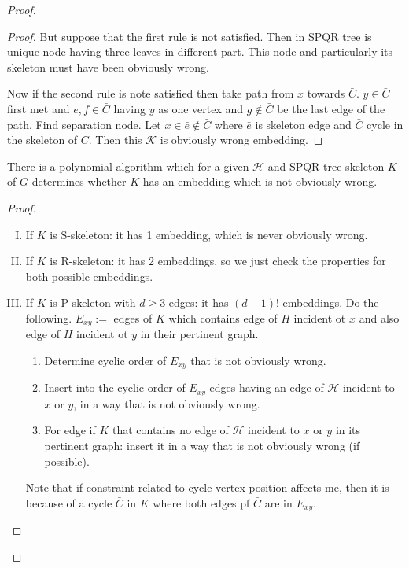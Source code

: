 \begin{proof}
\begin{proof}
		But suppose that the first rule is not satisfied. Then in SPQR tree is unique node having three leaves in different part. This node and particularly its skeleton must have been obviously wrong.
		
		Now if the second rule is note satisfied then take path from $x$ towards $\bar{C}$. $y \in \bar{C}$ first met and $e,f \in \bar{C}$ having $y$ as one vertex and $g \notin \bar{C}$ be the last edge of the path. Find separation node. Let $x\in \bar{e} \notin \bar{C}$ where $\bar{e}$ is skeleton edge and $\bar{C}$ cycle in the skeleton of $C$. Then this $\mathcal{K}$ is obviously wrong embedding.
	\end{proof}

	\begin{thm}
		There is a polynomial algorithm which for a given $\mathcal{H}$ and SPQR-tree skeleton $K$ of $G$ determines whether $K$ has an embedding which is not obviously wrong.
	\end{thm}

	\begin{proof}
		\begin{enumerate}[I)]
			\item If $K$ is S-skeleton: it has 1 embedding, which is never obviously wrong.
			\item If $K$ is R-skeleton: it has 2 embeddings, so we just check the properties for both possible embeddings.
			\item If $K$ is P-skeleton with $d \geq 3$ edges: it has $(d-1)!$ embeddings. Do the following. $E_{xy} :=$ edges of $K$ which contains edge of $H$ incident ot $x$ and also edge of $H$ incident ot $y$ in their pertinent graph.
			
			\begin{enumerate}[1]
				\item Determine cyclic order of $E_{xy}$ that is not obviously wrong.
				\item Insert into the cyclic order of $E_{xy}$ edges having an edge of $\mathcal{H}$ incident to $x$ or $y$, in a way that is not obviously wrong.
				\item For edge if $K$ that contains no edge of $\mathcal{H}$ incident to $x$ or $y$ in its pertinent graph: insert it in a way that is not obviously wrong (if possible).
			\end{enumerate}
		
			Note that if constraint related to cycle vertex position affects me, then it is because of a cycle $\bar{C}$ in $K$ where both edges pf $\bar{C}$ are in $E_{xy}$.
		\end{enumerate}
	\end{proof}
\end{proof}